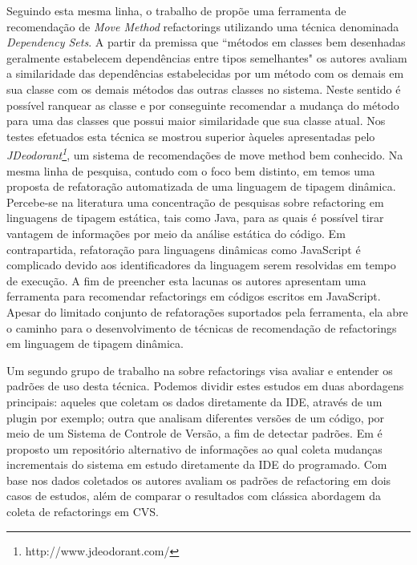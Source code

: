 \documentclass[12pt]{article}
\begin{document}
Seguindo esta mesma linha, o trabalho de \cite{wcre2013a} propõe uma ferramenta de recomendação de \textit{Move Method}{} refactorings utilizando uma técnica denominada \textit{Dependency Sets}{}. A partir da premissa que ``métodos em classes bem desenhadas geralmente estabelecem dependências entre tipos semelhantes" os autores avaliam a similaridade das dependências estabelecidas por um método com os demais em sua classe com os demais métodos das outras classes no sistema. Neste sentido é possível ranquear as classe  e por conseguinte recomendar a mudança do método para uma das classes que possui maior similaridade que sua classe atual. Nos testes efetuados esta técnica se mostrou superior àqueles apresentadas pelo \textit{JDeodorant\footnote{http://www.jdeodorant.com/}}, um sistema de recomendações de move method bem conhecido. Na mesma linha de pesquisa, contudo com o foco bem distinto, em \cite{Feldthaus11tool-supportedrefactoring} temos uma proposta de refatoração automatizada de uma linguagem de tipagem dinâmica. Percebe-se na literatura uma concentração de pesquisas sobre refactoring em linguagens de tipagem estática, tais como Java, para as quais é possível tirar vantagem de informações por meio da análise estática do código. Em contrapartida, refatoração para linguagens dinâmicas como JavaScript é complicado devido aos identificadores da linguagem serem resolvidas em tempo de execução. A fim de preencher esta lacunas os autores apresentam uma ferramenta para recomendar refactorings em códigos escritos em JavaScript. Apesar do limitado conjunto de refatorações suportados pela ferramenta, ela abre o caminho para o desenvolvimento de técnicas de recomendação de refactorings em linguagem de tipagem dinâmica.

Um segundo grupo de trabalho na sobre refactorings visa avaliar e entender os padrões de uso desta técnica. Podemos dividir estes estudos em duas abordagens principais: aqueles que coletam os dados diretamente da IDE, através de um plugin por exemplo; outra que analisam diferentes versões de um código, por meio de um Sistema de Controle de Versão, a fim de detectar padrões. Em  \cite{Robbes:2007:MCS:1268983.1269029} é proposto um repositório alternativo de informações ao qual coleta mudanças incrementais do sistema em estudo diretamente da IDE do programado. Com base nos dados coletados os autores avaliam os padrões de refactoring em dois casos de estudos, além de comparar o resultados com clássica abordagem da coleta de refactorings em CVS. 
\end{document}
